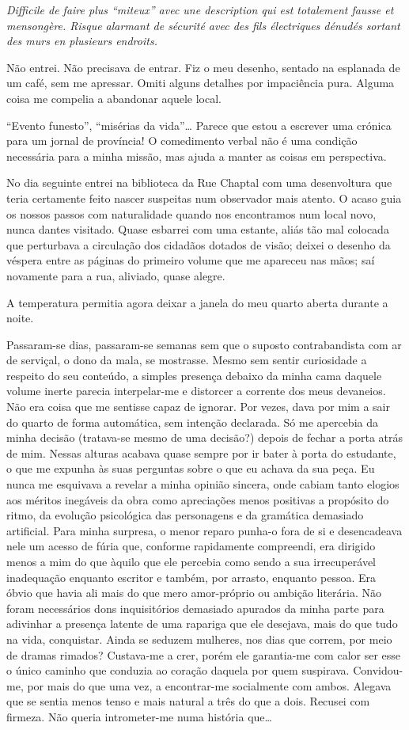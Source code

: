 \emph{Difficile de faire plus ``miteux'' avec une description qui est
totalement fausse et mensongère. Risque alarmant de sécurité avec des
fils électriques dénudés sortant des murs en plusieurs endroits.}

Não entrei. Não precisava de entrar. Fiz o meu desenho, sentado na
esplanada de um café, sem me apressar. Omiti alguns detalhes por
impaciência pura. Alguma coisa me compelia a abandonar aquele local.

``Evento funesto'', ``misérias da vida''\ldots{} Parece que estou a
escrever uma crónica para um jornal de província! O comedimento verbal
não é uma condição necessária para a minha missão, mas ajuda a manter as
coisas em perspectiva.

No dia seguinte entrei na biblioteca da Rue Chaptal com uma desenvoltura
que teria certamente feito nascer suspeitas num observador mais atento.
O acaso guia os nossos passos com naturalidade quando nos encontramos
num local novo, nunca dantes visitado. Quase esbarrei com uma estante,
aliás
tão mal colocada que perturbava a circulação dos cidadãos dotados de
visão; deixei o desenho da véspera entre as páginas do primeiro volume
que me apareceu nas mãos; saí novamente para a rua, aliviado, quase
alegre.

A temperatura permitia agora deixar a janela do meu quarto aberta
durante a noite.

Passaram-se dias, passaram-se semanas sem que o suposto contrabandista
com ar de serviçal, o dono da mala, se mostrasse. Mesmo sem sentir
curiosidade a respeito do seu conteúdo, a simples presença debaixo da
minha cama daquele volume inerte parecia interpelar-me e distorcer a
corrente dos meus devaneios. Não era coisa que me sentisse capaz de
ignorar. Por vezes, dava por mim a sair do quarto de forma automática,
sem intenção declarada. Só me apercebia da minha decisão (tratava-se
mesmo de uma decisão?) depois de fechar a porta atrás de mim. Nessas
alturas acabava quase sempre por ir bater à porta do estudante, o que me
expunha às suas perguntas sobre o que eu achava da sua peça. Eu nunca me
esquivava a revelar a minha opinião sincera, onde cabiam tanto elogios
aos méritos inegáveis da obra como apreciações menos positivas a
propósito do ritmo, da evolução psicológica das personagens e da
gramática demasiado artificial. Para minha surpresa, o menor reparo
punha-o fora de si e desencadeava nele um acesso de fúria que,
conforme rapidamente compreendi, era dirigido menos a mim do que àquilo
que ele percebia como sendo a sua irrecuperável inadequação enquanto
escritor e também, por arrasto, enquanto pessoa. Era óbvio que havia ali
mais do que mero amor-próprio ou ambição literária. Não foram
necessários dons inquisitórios demasiado apurados da minha parte para
adivinhar a presença latente de uma rapariga que ele desejava, mais do
que tudo
na vida, conquistar. Ainda se seduzem mulheres, nos dias que correm, por
meio de dramas rimados? Custava-me a crer, porém ele garantia-me com
calor ser esse o único caminho que conduzia ao coração daquela por quem
suspirava. Convidou-me, por mais do que uma vez, a encontrar-me socialmente com ambos.
Alegava que se sentia menos tenso e mais natural a três do que a dois.
Recusei com firmeza. Não queria intrometer-me numa história
que\ldots{}

